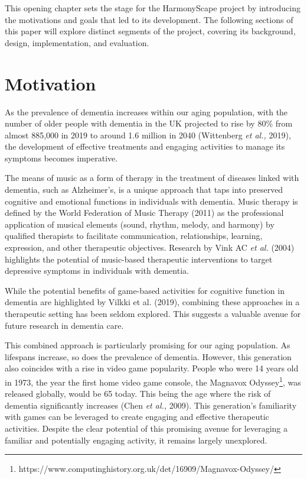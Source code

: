 \documentclass{l4proj}
\begin{document}
This opening chapter sets the stage for the HarmonyScape project by introducing the motivations and goals that led to its development. The following sections of this paper will explore distinct segments of the project, covering its background, design, implementation, and evaluation.

\section{Motivation}

As the prevalence of dementia increases within our aging population, with the number of older people with dementia in the UK projected to rise by 80\% from almost 885,000 in 2019 to around 1.6 million in 2040 (Wittenberg \emph{et al.,} 2019), the development of effective treatments and engaging activities to manage its symptoms becomes imperative.

The means of music as a form of therapy in the treatment of diseases linked with dementia, such as Alzheimer's, is a unique approach that taps into preserved cognitive and emotional functions in individuals with dementia. Music therapy is defined by the World Federation of Music Therapy (2011) as the professional application of musical elements (sound, rhythm, melody, and harmony) by qualified therapists to facilitate communication, relationships, learning, expression, and other therapeutic objectives. Research by Vink AC \emph{et al.} (2004) highlights the potential of music-based therapeutic interventions to target depressive symptoms in individuals with dementia.


While the potential benefits of game-based activities for cognitive function in dementia are highlighted by Vilkki et al. (2019), combining these approaches in a therapeutic setting has been seldom explored. This suggests a valuable avenue for future research in dementia care.

This combined approach is particularly promising for our aging population. As lifespans increase, so does the prevalence of dementia. However, this generation also coincides with a rise in video game popularity. People who were 14 years old in 1973, the year the first home video game console, the Magnavox Odyssey\footnote{https://www.computinghistory.org.uk/det/16909/Magnavox-Odyssey/}, was released globally, would be 65 today. This being the age where the risk of dementia significantly increases (Chen \emph{et al.,} 2009). This generation's familiarity with games can be leveraged to create engaging and effective therapeutic activities. Despite the clear potential of this promising avenue for leveraging a familiar and potentially engaging activity, it remains largely unexplored.
\end{document}
